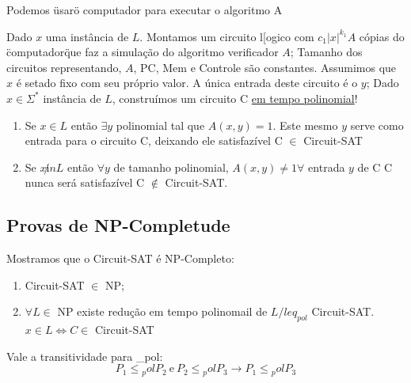 \documentclass[a4paper,oneside,article,table]{article}
\begin{document}
            Podemos \"usar\" o computador para executar o algoritmo A
        


            Dado $x$ uma instância de $L$. Montamos um circuito l[ogico com $c_1|x|^{k_1}A$ cópias do \"computador\" que faz a simulação do algoritmo verificador $A$;
            Tamanho dos circuitos representando, $A$, PC, Mem e Controle são constantes.
            Assumimos que $x$ é setado fixo com seu próprio valor.
            A única entrada deste circuito é o $y$;
            Dado $x \in \Sigma^*$ instância de $L$, construímos um circuito C \underline{em tempo polinomial}!
            \begin{enumerate}
                \item Se $x \in L$ então $\exists y$ polinomial tal que $A(x,y) = 1$. Este mesmo $y$ serve como entrada para o circuito C, deixando ele satisfazível \rightarrow C $\in$ Circuit-SAT
                \item Se $x \not in L$ então $\forall y$ de tamanho polinomial, $A(x,y) \neq 1 \forall$ entrada $y$ de C \rightarrow C nunca será satisfazível \rightarrow C $\notin$ Circuit-SAT.
            \end{enumerate}

            \subsection{Provas de NP-Completude}
            Mostramos que o Circuit-SAT é  NP-Completo:
            \begin{enumerate}
                \item Circuit-SAT $\in$ NP;
                \item $\forall L \in$ NP existe redução em tempo polinomail de $L /{leq}_{pol}$ Circuit-SAT.\\
                    $x \in L \iff C \in$ Circuit-SAT
            \end{enumerate}

            Vale a transitividade para {\leq}_{pol}:
            \begin{equation*}
                P_1 {\leq}{_pol} P_2~\mathrm{e}~P_2 {\leq}{_pol} P_3 \rightarrow P_1 {\leq}{_pol} P_3
            \end{equation*}
\end{document}
